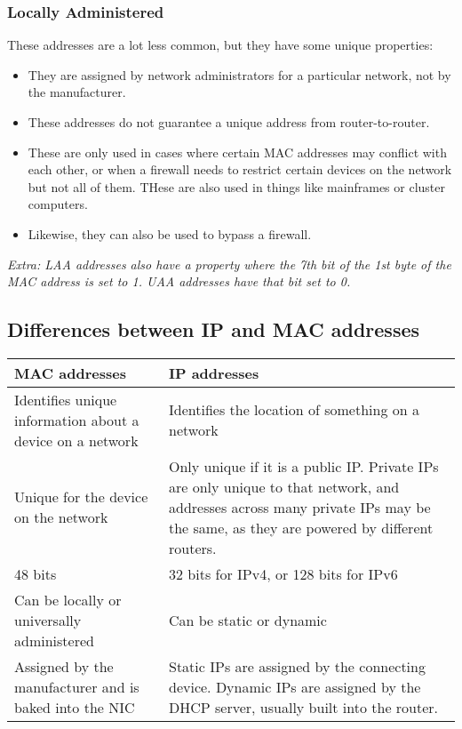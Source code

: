 \documentclass[../main.tex]{subfiles}
\begin{document}
\subsubsection{Locally Administered}

These addresses are a lot less common, but they have some unique properties:

\begin{itemize}
    \item They are assigned by network administrators for a particular network, not by the manufacturer.
    \item These addresses do not guarantee a unique address from router-to-router.
    \item These are only used in cases where certain MAC addresses may conflict with each other, or when a firewall needs to restrict certain devices on the network but not all of them. THese are also used in things like mainframes or cluster computers.
    \item Likewise, they can also be used to bypass a firewall.
\end{itemize}

\emph{Extra: LAA addresses also have a property where the 7th bit of the 1st byte of the MAC address is set to 1. UAA addresses have that bit set to 0.}

\subsection{Differences between IP and MAC addresses}

\begin{longtable}{|p{}|p{}|}
    \hline 
    \textbf{MAC addresses} & \textbf{IP addresses}
    \\ \hline
Identifies unique information about a device on a network & Identifies the location of something on a network
    \\ \hline
    Unique for the device on the network & Only unique if it is a public IP. Private IPs are only unique to that network, and addresses across many private IPs may be the same, as they are powered by different routers.
    \\ \hline
    48 bits & 32 bits for IPv4, or 128 bits for IPv6
    \\ \hline
    Can be locally or universally administered & Can be static or dynamic
    \\ \hline
    Assigned by the manufacturer and is baked into the NIC & Static IPs are assigned by the connecting device. Dynamic IPs are assigned by the DHCP server, usually built into the router.
    \\ \hline
\end{longtable}
\end{document}
